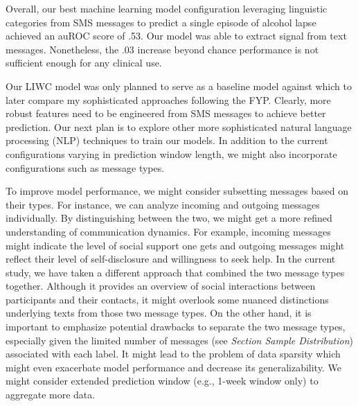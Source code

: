 \documentclass[
  letterpaper,
  DIV=11,
  numbers=noendperiod]{scrartcl}
\begin{document}
Overall, our best machine learning model configuration leveraging
linguistic categories from SMS messages to predict a single episode of
alcohol lapse achieved an auROC score of .53. Our model was able to
extract signal from text messages. Nonetheless, the .03 increase beyond
chance performance is not sufficient enough for any clinical use.

Our LIWC model was only planned to serve as a baseline model against
which to later compare my sophisticated approaches following the FYP.
Clearly, more robust features need to be engineered from SMS messages to
achieve better prediction. Our next plan is to explore other more
sophisticated natural language processing (NLP) techniques to train our
models. In addition to the current configurations varying in prediction
window length, we might also incorporate configurations such as message
types.

To improve model performance, we might consider subsetting messages
based on their types. For instance, we can analyze incoming and outgoing
messages individually. By distinguishing between the two, we might get a
more refined understanding of communication dynamics. For example,
incoming messages might indicate the level of social support one gets
and outgoing messages might reflect their level of self-disclosure and
willingness to seek help. In the current study, we have taken a
different approach that combined the two message types together.
Although it provides an overview of social interactions between
participants and their contacts, it might overlook some nuanced
distinctions underlying texts from those two message types. On the other
hand, it is important to emphasize potential drawbacks to separate the
two message types, especially given the limited number of messages (see
\emph{Section Sample Distribution}) associated with each label. It might
lead to the problem of data sparsity which might even exacerbate model
performance and decrease its generalizability. We might consider
extended prediction window (e.g., 1-week window only) to aggregate more
data.
\end{document}
